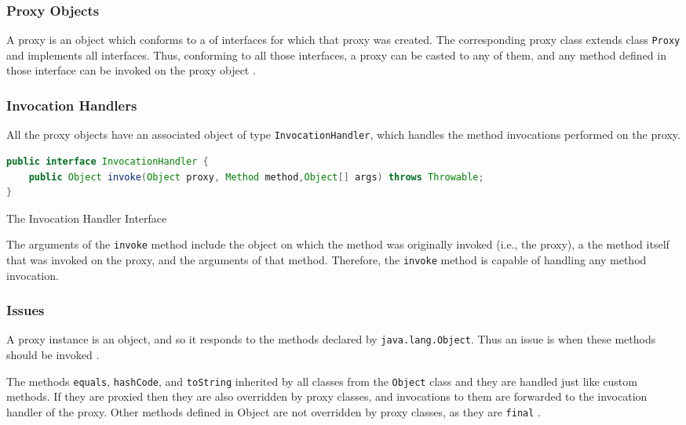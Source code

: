 \subsubsection{Proxy Objects}
A proxy is an object which conforms to a of interfaces for which that proxy was created. 
The corresponding proxy class extends class \texttt{Proxy} and implements all interfaces.
Thus, conforming to all those interfaces, a proxy can be casted to any of them, and any method defined in those interface can be invoked on the proxy object \cite{eugster2006uniform}.

\subsubsection{Invocation Handlers}
All the proxy objects have an associated object of type \texttt{InvocationHandler}, which handles the method invocations performed on the proxy.

\begin{sourcecode}
	\begin{lstlisting}[language=Java]
public interface InvocationHandler {
	public Object invoke(Object proxy, Method method,Object[] args) throws Throwable;
}		
	\end{lstlisting}
	\caption{The Invocation Handler Interface}
\end{sourcecode}

The arguments of the \texttt{invoke} method include the object on which the method was originally invoked (i.e., the proxy), a the method itself that was invoked on the proxy, and the arguments of that method.
Therefore, the \texttt{invoke} method is capable of handling any method invocation.

\subsubsection{Issues}
A proxy instance is an object, and so it responds to the methods declared by \texttt{java.lang.Object}. Thus an issue is when these methods should be invoked \cite{forman2004java}.

The methods \texttt{equals}, \texttt{hashCode}, and \texttt{toString} inherited by all classes from the \texttt{Object} class and they are handled just like custom methods.
If they are proxied then they are also overridden by proxy classes, and invocations to them are forwarded to the invocation handler of the proxy. 
Other methods defined in Object are not overridden by proxy classes, as they are \texttt{final} \cite{eugster2006uniform}.

